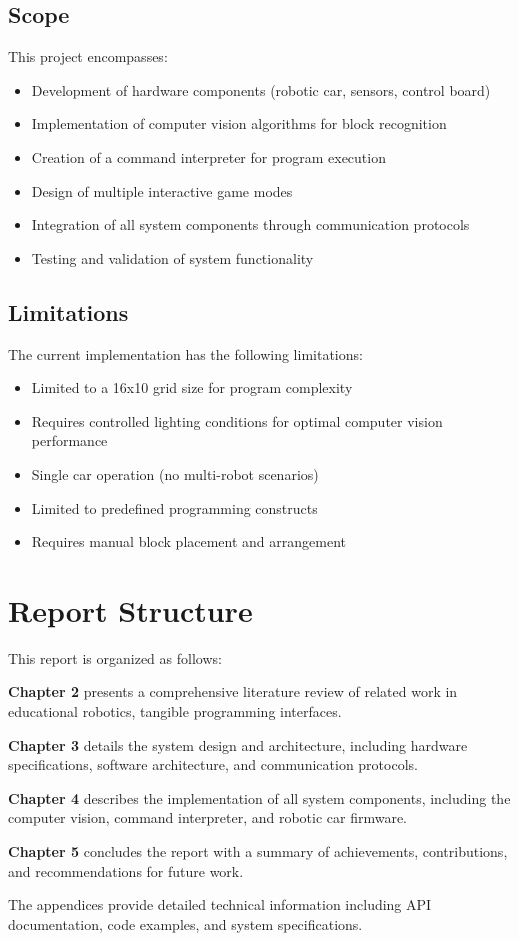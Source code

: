 \subsection{Scope}
This project encompasses:
\begin{itemize}
    \item Development of hardware components (robotic car, sensors, control board)
    \item Implementation of computer vision algorithms for block recognition
    \item Creation of a command interpreter for program execution
    \item Design of multiple interactive game modes
    \item Integration of all system components through communication protocols
    \item Testing and validation of system functionality
\end{itemize}

\subsection{Limitations}
The current implementation has the following limitations:
\begin{itemize}
    \item Limited to a 16x10 grid size for program complexity
    \item Requires controlled lighting conditions for optimal computer vision performance
    \item Single car operation (no multi-robot scenarios)
    \item Limited to predefined programming constructs
    \item Requires manual block placement and arrangement
\end{itemize}

\section{Report Structure}

This report is organized as follows:

\textbf{Chapter 2} presents a comprehensive literature review of related work in educational robotics, tangible programming interfaces.

\textbf{Chapter 3} details the system design and architecture, including hardware specifications, software architecture, and communication protocols.

\textbf{Chapter 4} describes the implementation of all system components, including the computer vision, command interpreter, and robotic car firmware.

\textbf{Chapter 5} concludes the report with a summary of achievements, contributions, and recommendations for future work.

The appendices provide detailed technical information including API documentation, code examples, and system specifications.